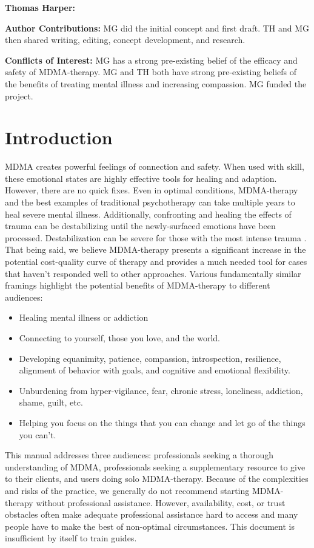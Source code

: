 \documentclass[12pt,letterpaper]{article}
\begin{document}
\textbf{Thomas Harper:}

\vspace{\baselineskip}

\textbf{Author Contributions:} MG did the initial concept and first draft. TH and MG then shared writing, editing, concept development, and research.

\textbf{Conflicts of Interest:} MG has a strong pre-existing belief of the efficacy and safety of MDMA-therapy. MG and TH both have strong pre-existing beliefs of the benefits of treating mental illness and increasing compassion. MG funded the project.

\section{Introduction}
MDMA creates powerful feelings of connection and safety. When used with skill, these emotional states are highly effective tools for healing and adaption. However, there are no quick fixes. Even in optimal conditions, MDMA-therapy and the best examples of traditional psychotherapy can take multiple years to heal severe mental illness. Additionally, confronting and healing the effects of trauma can be destabilizing until the newly-surfaced emotions have been processed. Destabilization can be severe for those with the most intense trauma \cite{studyingHarms}. That being said, we believe MDMA-therapy presents a significant increase in the potential cost-quality curve of therapy and provides a much needed tool for cases that haven't responded well to other approaches. Various fundamentally similar framings highlight the potential benefits of MDMA-therapy to different audiences:
\begin{itemize}
    \item Healing mental illness or addiction
    \item Connecting to yourself, those you love, and the world.
    \item Developing equanimity, patience, compassion, introspection, resilience, alignment of behavior with goals, and cognitive and emotional flexibility. 
    \item Unburdening from hyper-vigilance, fear, chronic stress, loneliness, addiction, shame, guilt, etc.
    \item Helping you focus on the things that you can change and let go of the things you can’t. 
\end{itemize}
This manual addresses three audiences: professionals seeking a thorough understanding of MDMA, professionals seeking a  supplementary resource to give to their clients, and users doing solo MDMA-therapy. Because of the complexities and risks of the practice, we generally do not recommend starting MDMA-therapy without professional assistance. However, availability, cost, or trust obstacles often make adequate professional assistance hard to access and many people have to make the best of non-optimal circumstances. This document is insufficient by itself to train guides.
\end{document}
